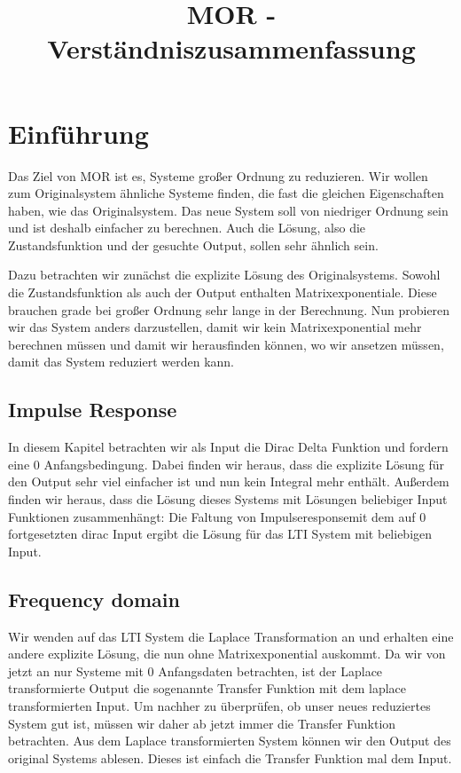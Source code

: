 \documentclass[]{article}
\title{MOR - Verständniszusammenfassung}
\begin{document}
\maketitle

\section{Einführung}
Das Ziel von MOR ist es, Systeme großer Ordnung zu reduzieren. Wir wollen zum Originalsystem ähnliche Systeme finden, die fast die gleichen Eigenschaften haben, wie das Originalsystem. Das neue System soll von niedriger Ordnung sein und ist deshalb einfacher zu berechnen. Auch die Lösung, also die Zustandsfunktion und der gesuchte Output, sollen sehr ähnlich sein. 

Dazu betrachten wir zunächst die explizite Lösung des Originalsystems. Sowohl die Zustandsfunktion als auch der Output enthalten Matrixexponentiale. Diese brauchen grade bei großer Ordnung sehr lange in der Berechnung. Nun probieren wir das System anders darzustellen, damit wir kein Matrixexponential mehr berechnen müssen und damit wir herausfinden können, wo wir ansetzen müssen, damit das System reduziert werden kann.  

\subsection{Impulse Response}
In diesem Kapitel betrachten wir als Input die Dirac Delta Funktion und fordern eine 0 Anfangsbedingung. Dabei finden wir heraus, dass die explizite Lösung für den Output sehr viel einfacher ist und nun kein Integral mehr enthält. Außerdem finden wir heraus, dass die Lösung dieses Systems mit Lösungen beliebiger Input Funktionen zusammenhängt: Die Faltung von \glqq Impulseresponse\grqq mit dem auf 0 fortgesetzten dirac Input ergibt die Lösung für das LTI System mit beliebigen Input.  

\subsection{Frequency domain}
Wir wenden auf das LTI System die Laplace Transformation an und erhalten eine andere explizite Lösung, die nun ohne Matrixexponential auskommt. Da wir von jetzt an nur Systeme mit 0 Anfangsdaten betrachten, ist der Laplace transformierte Output die sogenannte Transfer Funktion mit dem laplace transformierten Input. Um nachher zu überprüfen, ob unser neues reduziertes System gut ist, müssen wir daher ab jetzt immer die Transfer Funktion betrachten. Aus dem Laplace transformierten System können wir den Output des original Systems ablesen. Dieses ist einfach die Transfer Funktion mal dem Input. 
\end{document}
